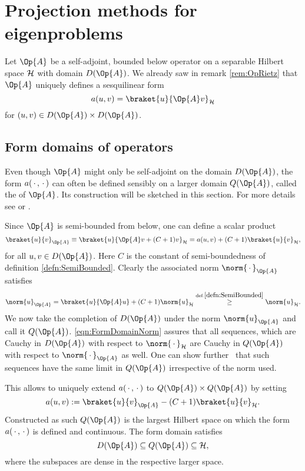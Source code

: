 \section{Projection methods for eigenproblems}
\label{sec:Projection}

Let $\Op{A}$ be a self-adjoint, bounded below operator on a separable Hilbert space
$\mathcal{H}$ with domain $D(\Op{A})$.
We already saw in remark \vref{rem:OpRietz}
that $\Op{A}$ uniquely defines a sesquilinear form
\[ a(u, v) = \braket{u}{\Op{A} v}_\hilbert \]
for $(u, v) \in D(\Op{A}) \times D(\Op{A})$.

\subsection{Form domains of operators}
\label{sec:FormDomain}
Even though $\Op{A}$ might only be self-adjoint on the domain $D(\Op{A})$,
the form $a(\,\cdot\,, \,\cdot\,)$ can often be defined sensibly
on a larger domain $Q(\Op{A})$, called the  of $\Op{A}$.
Its construction will be sketched in this section.
For more details see \cite[p. 77]{Teschl2014} or \cite[p. 276]{Reed1980}.

\noindent
Since $\Op{A}$ is semi-bounded from below, one can define a scalar product
\[
	\braket{u}{v}_{\Op{A}} \equiv \braket{u}{\Op{A} v + (C + 1) v}_{\hilbert}
	= a(u, v) + (C+1) \braket{u}{v}_{\hilbert},
\]
for all $u,v \in D(\Op{A})$.
Here $C$ is the constant of semi-boundedness of definition \vref{defn:SemiBounded}.
Clearly the associated norm $\norm{\slot}_{\Op{A}}$ satisfies
\begin{equation}
	\label{eqn:FormDomainNorm}
\norm{u}_{\Op{A}}
= \braket{u}{\Op{A} u} + (C+1) \norm{u}_{\hilbert}
\stackrel{\text{def.} \ref{defn:SemiBounded}}{\geq} \norm{u}_{\hilbert}.
\end{equation}
We now take the completion of $D(\Op{A})$ under the norm $\norm{u}_{\Op{A}}$
and call it $Q(\Op{A})$.
\eqref{eqn:FormDomainNorm} assures that all sequences,
which are Cauchy in $D(\Op{A})$ with respect to $\norm{\slot}_{\hilbert}$
are Cauchy in $Q(\Op{A})$ with respect to $\norm{\slot}_{\Op{A}}$ as well.
One can show further~\cite{Teschl2014} that such sequences
have the same limit in $Q(\Op{A})$ irrespective of the norm used.

\noindent
This allows to uniquely
extend $a(\,\cdot\,, \,\cdot\,)$ to $Q(\Op{A}) \times Q(\Op{A})$ by setting
\[ a(u, v) := \braket{u}{v}_{\Op{A}} - (C+1) \braket{u}{v}_{\hilbert}. \]
Constructed as such $Q(\Op{A})$ is the largest Hilbert space on which the form
$a(\,\cdot\,, \,\cdot\,)$ is defined and continuous.
The form domain satisfies
\[ D(\Op{A}) \subseteq Q(\Op{A}) \subseteq \hilbert, \]
where the subspaces are dense in the respective larger space.

